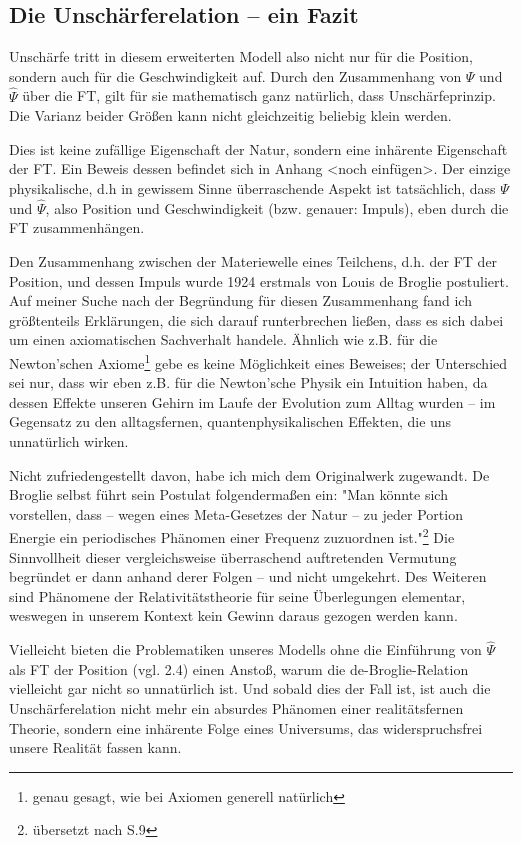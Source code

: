\documentclass[a4paper,12pt,ngerman]{scrartcl}
\theoremstyle{plain}
\theoremstyle{plain}
\theoremstyle{plain}
\theoremstyle{plain}
\begin{document}
\subsection{Die Unschärferelation -- ein Fazit}

Unschärfe tritt in diesem erweiterten Modell also nicht nur für die Position, sondern auch für die Geschwindigkeit auf. Durch den Zusammenhang von $\Psi$ und $\widehat{\Psi}$ über die FT, gilt für sie mathematisch ganz natürlich, dass Unschärfeprinzip. Die Varianz beider Größen kann nicht gleichzeitig beliebig klein werden. 

Dies ist keine zufällige Eigenschaft der Natur, sondern eine inhärente Eigenschaft der FT. Ein Beweis dessen befindet sich in Anhang <noch einfügen>. Der einzige physikalische, d.h in gewissem Sinne überraschende Aspekt ist tatsächlich, dass $\Psi$ und $\widehat{\Psi}$, also Position und Geschwindigkeit (bzw. genauer: Impuls), eben durch die FT zusammenhängen.

Den Zusammenhang zwischen der Materiewelle eines Teilchens, d.h. der FT der Position, und dessen Impuls wurde 1924 erstmals von Louis de Broglie postuliert. Auf meiner Suche nach der Begründung für diesen Zusammenhang fand ich größtenteils Erklärungen, die sich darauf runterbrechen ließen, dass es sich dabei um einen axiomatischen Sachverhalt handele. Ähnlich wie z.B. für die Newton'schen Axiome\footnote{genau gesagt, wie bei Axiomen generell natürlich} gebe es keine Möglichkeit eines Beweises; der Unterschied sei nur, dass wir eben z.B. für die Newton'sche Physik ein Intuition haben, da dessen Effekte unseren Gehirn im Laufe der Evolution zum Alltag wurden -- im Gegensatz zu den alltagsfernen, quantenphysikalischen Effekten, die uns unnatürlich wirken.

Nicht zufriedengestellt davon, habe ich mich dem Originalwerk zugewandt. De Broglie selbst führt sein Postulat folgendermaßen ein: "Man könnte sich vorstellen, dass -- wegen eines Meta-Gesetzes der Natur -- zu jeder Portion Energie ein periodisches Phänomen einer Frequenz zuzuordnen ist."\footnote{übersetzt nach S.9} Die Sinnvollheit dieser vergleichsweise überraschend auftretenden Vermutung begründet er dann anhand derer Folgen -- und nicht umgekehrt. Des Weiteren sind Phänomene der Relativitätstheorie für seine Überlegungen elementar, weswegen in unserem Kontext kein Gewinn daraus gezogen werden kann.

Vielleicht bieten die Problematiken unseres Modells ohne die Einführung von $\widehat{\Psi}$ als FT der Position (vgl. 2.4) einen Anstoß, warum die de-Broglie-Relation vielleicht gar nicht so unnatürlich ist. Und sobald dies der Fall ist, ist auch die Unschärferelation nicht mehr ein absurdes Phänomen einer realitätsfernen Theorie, sondern eine inhärente Folge eines Universums, das widerspruchsfrei unsere Realität fassen kann. 
\end{document}
